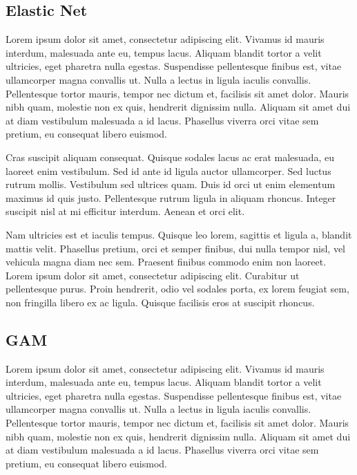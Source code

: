 \documentclass[a4paper, nobind]{templates/ociamthesis}
\theoremstyle{definition}
\theoremstyle{definition}
\theoremstyle{definition}
\theoremstyle{remark}
\begin{document}
\hypertarget{elastic-net}{%
\subsection{Elastic Net}\label{elastic-net}}

Lorem ipsum dolor sit amet, consectetur adipiscing elit. Vivamus id mauris interdum, malesuada ante eu, tempus lacus. Aliquam blandit tortor a velit ultricies, eget pharetra nulla egestas. Suspendisse pellentesque finibus est, vitae ullamcorper magna convallis ut. Nulla a lectus in ligula iaculis convallis. Pellentesque tortor mauris, tempor nec dictum et, facilisis sit amet dolor. Mauris nibh quam, molestie non ex quis, hendrerit dignissim nulla. Aliquam sit amet dui at diam vestibulum malesuada a id lacus. Phasellus viverra orci vitae sem pretium, eu consequat libero euismod.

Cras suscipit aliquam consequat. Quisque sodales lacus ac erat malesuada, eu laoreet enim vestibulum. Sed id ante id ligula auctor ullamcorper. Sed luctus rutrum mollis. Vestibulum sed ultrices quam. Duis id orci ut enim elementum maximus id quis justo. Pellentesque rutrum ligula in aliquam rhoncus. Integer suscipit nisl at mi efficitur interdum. Aenean et orci elit.

Nam ultricies est et iaculis tempus. Quisque leo lorem, sagittis et ligula a, blandit mattis velit. Phasellus pretium, orci et semper finibus, dui nulla tempor nisl, vel vehicula magna diam nec sem. Praesent finibus commodo enim non laoreet. Lorem ipsum dolor sit amet, consectetur adipiscing elit. Curabitur ut pellentesque purus. Proin hendrerit, odio vel sodales porta, ex lorem feugiat sem, non fringilla libero ex ac ligula. Quisque facilisis eros at suscipit rhoncus.

\hypertarget{gam}{%
\subsection{GAM}\label{gam}}

Lorem ipsum dolor sit amet, consectetur adipiscing elit. Vivamus id mauris interdum, malesuada ante eu, tempus lacus. Aliquam blandit tortor a velit ultricies, eget pharetra nulla egestas. Suspendisse pellentesque finibus est, vitae ullamcorper magna convallis ut. Nulla a lectus in ligula iaculis convallis. Pellentesque tortor mauris, tempor nec dictum et, facilisis sit amet dolor. Mauris nibh quam, molestie non ex quis, hendrerit dignissim nulla. Aliquam sit amet dui at diam vestibulum malesuada a id lacus. Phasellus viverra orci vitae sem pretium, eu consequat libero euismod.
\end{document}
